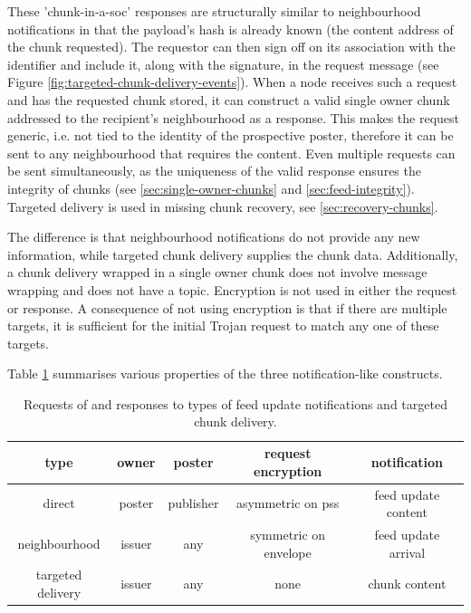 These 'chunk-in-a-soc' responses are structurally similar to neighbourhood notifications in that the payload's hash is already known (the content address of the chunk requested). The requestor can then sign off on its association with the identifier and include it, along with the signature, in the request message (see Figure \ref{fig:targeted-chunk-delivery-events}). When a node receives such a request and has the requested chunk stored, it can construct a valid single owner chunk addressed to the recipient's neighbourhood as a response.
This makes the request generic, i.e. not tied to the identity of the prospective poster, therefore it can be sent to any neighbourhood that requires the content. Even multiple requests can be sent simultaneously, as the uniqueness of the valid response ensures the integrity of chunks (see \ref{sec:single-owner-chunks} and \ref{sec:feed-integrity}). Targeted delivery is used in missing chunk recovery, see \ref{sec:recovery-chunks}.

The difference is that neighbourhood notifications do not provide any new information, while targeted chunk delivery supplies the chunk data. Additionally, a chunk delivery wrapped in a single owner chunk does not involve message wrapping and does not have a topic. Encryption is not used in either the request or response.
A consequence of not using encryption is that if there are multiple targets, it is sufficient for the initial Trojan request to match any one of these targets. 

Table \ref{tab:notifications} summarises various properties of the three notification-like constructs.

\begin{table}[htpb]
    \centering
    \begin{tabular}{c|c|c|c|c|}
    type & owner & poster & request encryption & notification  \\\hline
         direct & poster & publisher & asymmetric on pss & feed update  content\\
         neighbourhood & issuer & any & symmetric on envelope & feed update arrival\\
         targeted delivery & issuer & any & none & chunk content\\
    \end{tabular}
    \caption[Feed update notifications]{Requests of and responses to types of feed update notifications and targeted chunk delivery.}
    \label{tab:notifications}
\end{table}

